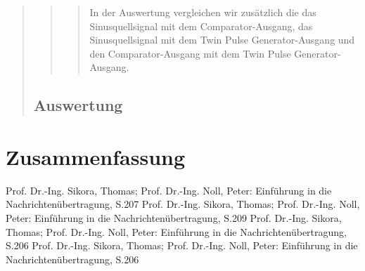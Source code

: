 \begin{quote}
\begin{quote}
\begin{quote}
        In der Auswertung vergleichen wir zusätzlich die das Sinusquellsignal
        mit dem Comparator-Ausgang, das Sinusquellsignal mit dem Twin Pulse
        Generator-Ausgang und den Comparator-Ausgang mit dem Twin Pulse
        Generator-Ausgang.
         
        \end{quote}
        
    \end{quote}
    
    \subsection{Auswertung}
    \begin{quote}
        
    \end{quote}	
\end{quote}


\section{Zusammenfassung}
\begin{quote}
	
\end{quote}



\begin{thebibliography}{999}
 Prof. Dr.-Ing. Sikora, Thomas; Prof. Dr.-Ing. Noll, Peter: Einführung in die
Nachrichtenübertragung, S.207
 Prof. Dr.-Ing. Sikora, Thomas; Prof. Dr.-Ing. Noll, Peter: Einführung in die
Nachrichtenübertragung, S.209
 Prof. Dr.-Ing. Sikora, Thomas; Prof. Dr.-Ing. Noll, Peter: Einführung in die
Nachrichtenübertragung, S.206
 Prof. Dr.-Ing. Sikora, Thomas; Prof. Dr.-Ing. Noll, Peter: Einführung in die
Nachrichtenübertragung, S.206

\end{thebibliography}


